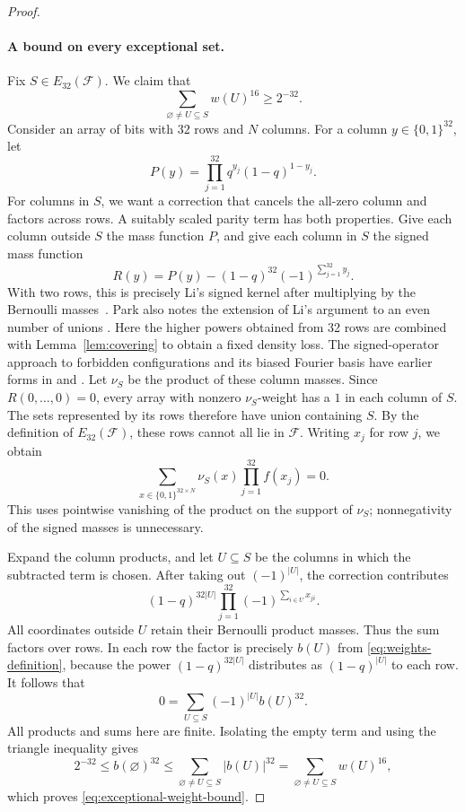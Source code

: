 \documentclass[11pt,letterpaper]{article}
\theoremstyle{definition}
\theoremstyle{remark}
\numberwithin{equation}{section}
\begin{document}
\begin{proof}
\paragraph{A bound on every exceptional set.}
Fix $S\in E_{32}(\mathcal F)$. We claim that
\begin{equation}\label{eq:exceptional-weight-bound}
 \sum_{\varnothing\ne U\subseteq S}w(U)^{16}\ge2^{-32}.
\end{equation}
Consider an array of bits with $32$ rows and $N$ columns. For a column
$y\in\{0,1\}^{32}$, let
\[
 P(y)=\prod_{j=1}^{32}q^{y_j}(1-q)^{1-y_j}.
\]
For columns in $S$, we want a correction that cancels the all-zero column
and factors across rows. A suitably scaled parity term has both properties.
Give each column outside $S$ the mass function $P$, and give each column
in $S$ the signed mass function
\[
 R(y)=P(y)-(1-q)^{32}(-1)^{\sum_{j=1}^{32}y_j}.
\]
With two rows, this is precisely Li's signed kernel after multiplying
by the Bernoulli masses~\cite[Section~2]{Li26}. Park also notes the
extension of Li's argument to an even number of unions
\cite[Corollary~3.5, footnote~3]{Park26}. Here the higher powers obtained
from 32 rows are combined with Lemma~\ref{lem:covering} to obtain a
fixed density loss.
The signed-operator approach to forbidden configurations and its biased
Fourier basis have earlier forms in
\cite[Section~2.2]{Friedgut08} and
\cite[Section~4.1]{EllisFilmusFriedgut12}.
Let $\nu_S$ be the product of these column masses. Since
$R(0,\ldots,0)=0$, every array with nonzero $\nu_S$-weight has a $1$
in each column of $S$. The sets represented by its rows therefore have
union containing $S$. By the definition of $E_{32}(\mathcal F)$, these
rows cannot all lie in $\mathcal F$. Writing $x_j$ for row $j$, we obtain
\[
 \sum_{x\in\{0,1\}^{32\times N}}\nu_S(x)
 \prod_{j=1}^{32}f(x_j)=0.
\]
This uses pointwise vanishing of the product on the support of $\nu_S$;
nonnegativity of the signed masses is unnecessary.

Expand the column products, and let $U\subseteq S$ be the columns in
which the subtracted term is chosen. After taking out $(-1)^{|U|}$,
the correction contributes
\[
 (1-q)^{32|U|}\prod_{j=1}^{32}
 (-1)^{\sum_{i\in U}x_{ji}}.
\]
All coordinates outside $U$ retain their Bernoulli product masses.
Thus the sum factors over rows. In each row the factor is precisely
$b(U)$ from \eqref{eq:weights-definition}, because the power
$(1-q)^{32|U|}$ distributes as $(1-q)^{|U|}$ to each row.
It follows that
\begin{equation}\label{eq:signed-identity}
 0=\sum_{U\subseteq S}(-1)^{|U|}b(U)^{32}.
\end{equation}
All products and sums here are finite. Isolating the empty term and
using the triangle inequality gives
\[
 2^{-32}\le b(\varnothing)^{32}
 \le\sum_{\varnothing\ne U\subseteq S}|b(U)|^{32}
 =\sum_{\varnothing\ne U\subseteq S}w(U)^{16},
\]
which proves \eqref{eq:exceptional-weight-bound}.


\end{proof}
\end{document}
